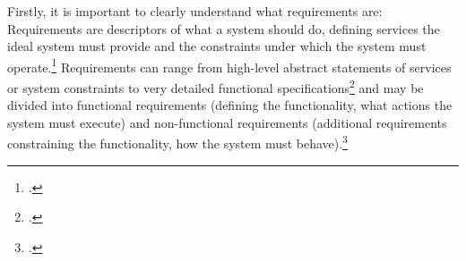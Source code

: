 Firstly, it is important to clearly understand what requirements are: Requirements are descriptors of what a system should do, defining services the ideal system must provide and the constraints under which the system must operate.\footcites[Cf.][p.100]{SommervilleSoftwareengineering2011}[cf.][p.95]{IEEEIEEEstandardglossary1990} Requirements can range from high-level abstract statements of services or system constraints to very detailed functional specifications\footcite[Cf.][p.215]{DavisSoftwarerequirementsobjects1993} and may be divided into functional requirements (defining the functionality, what actions the system must execute) and non-functional requirements (additional requirements constraining the functionality, how the system must behave).\footcites[Cf.][p.34]{IEEEIEEEstandardglossary1990}[cf.][p.102]{SommervilleSoftwareengineering2011}

